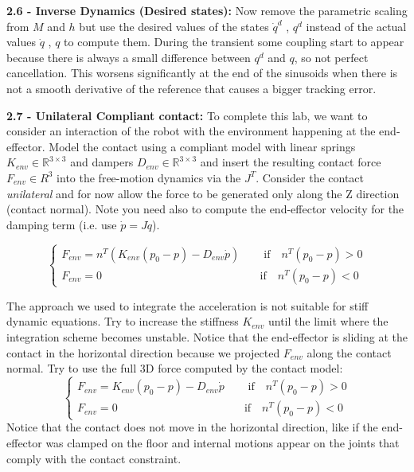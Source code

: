 \documentclass[11pt]{article}
\newcommand{\Rnum}{\mathbb{R}} %
\begin{document}
\quad

\noindent
\textbf{ 2.6 - Inverse Dynamics (Desired states):}
Now remove  the parametric scaling from  $M$ and $h$  but use the desired values of the states $\dot{q}^d$ , $q^d$  instead of 
the actual values $\dot{q}$ , $q$ to compute them. During the transient some coupling start to appear because there is always a small difference between $q^d$ and $q$, so not perfect cancellation. This worsens significantly at the end of the sinusoids when there is not a smooth derivative of the reference that causes a bigger tracking error.
 
\quad

\noindent 
\textbf{ 2.7 - Unilateral Compliant contact:} 
To complete this lab, we want to consider an interaction of the robot with the environment happening at the end-effector. 
Model the contact using a compliant model with linear  springs $K_{env}\in \Rnum^{3 \times 3}$ and dampers $D_{env}\in \Rnum^{3 \times 3}$  and insert the resulting contact force $F_{env} \in R^3$ into the free-motion dynamics via the $J^T$. Consider the contact \textit{unilateral} and for now allow the force to be generated only along the Z direction (contact normal).
Note you need also to compute the end-effector velocity for the damping term (i.e. use $\dot{p} = J\dot{q}$).

\begin{equation*}
\begin{cases}
	F_{env} = n^T (K_{env}(p_0 - p) - D_{env} \dot{p}) \quad &\text{   if}\quad n^T(p_0 -p ) >0 \\ 
	F_{env} = 0     \quad &\text{if}\quad n^T(p_0 -p ) <0
\end{cases}
\end{equation*}

The approach we used to integrate the acceleration is not suitable for stiff dynamic equations. Try to increase the stiffness $K_{env}$ until the limit where the integration scheme becomes unstable.
Notice that the end-effector is  sliding at the contact in the horizontal direction because we projected $F_{env}$ along the contact normal.
Try to use the full 3D force computed by the contact model:
\begin{equation*}
\begin{cases}
F_{env} = K_{env}(p_0 - p) - D_{env} \dot{p} \quad &\text{   if}\quad n^T(p_0 -p ) >0 \\ 
F_{env} = 0     \quad &\text{if}\quad n^T(p_0 -p ) <0
\end{cases}
\end{equation*}
%
Notice that the contact does not move in the horizontal direction, like if the end-effector was clamped on the floor and internal motions appear on the joints that comply with the contact constraint. 
\end{document}
